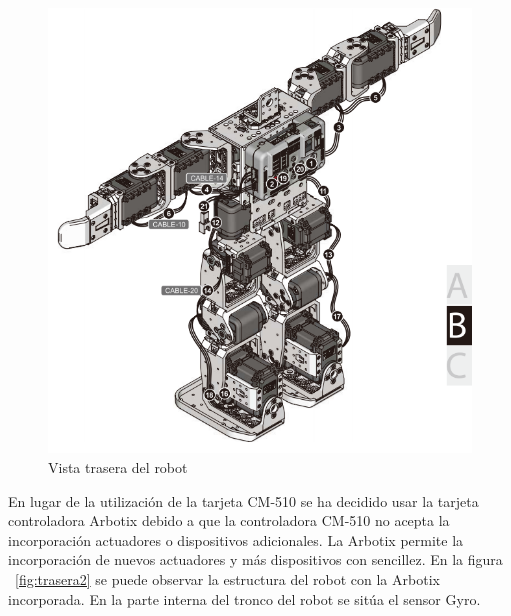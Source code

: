 \begin{figure}[hbtp]
\centering
\includegraphics[scale=0.4]{imagenes/RobotTrasero.png}
\caption{Vista trasera del robot}
\label{fig:trasera1}
\end{figure}

En lugar de la utilización de la tarjeta CM-510 se ha decidido usar la tarjeta controladora Arbotix debido a que la controladora CM-510 no acepta la incorporación actuadores o dispositivos adicionales. La Arbotix permite la incorporación de nuevos actuadores y más dispositivos con sencillez. En la figura ~\ref{fig:trasera2} se puede observar la estructura del robot con la Arbotix incorporada. En la parte interna del tronco del robot se sitúa el sensor Gyro.

